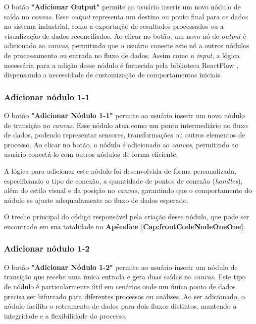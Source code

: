 O botão \textbf{"Adicionar Output"} permite ao usuário inserir um novo nódulo de saída no \textit{canvas}. Esse \textit{output} representa um destino ou ponto final para os dados no sistema industrial, como a exportação de resultados processados ou a visualização de dados reconciliados. Ao clicar no botão, um novo nó de \textit{output} é adicionado ao \textit{canvas}, permitindo que o usuário conecte este nó a outros nódulos de processamento ou entrada no fluxo de dados. Assim como o \textit{input}, a lógica necessária para a adição desse nódulo é fornecida pela biblioteca ReactFlow \cite{reactflow}, dispensando a necessidade de customização de comportamentos iniciais.

\subsubsection{Adicionar nódulo 1-1}

O botão \textbf{"Adicionar Nódulo 1-1"} permite ao usuário inserir um novo nódulo de transição no \textit{canvas}. Esse nódulo atua como um ponto intermediário no fluxo de dados, podendo representar sensores, transformações ou outros elementos de processo. Ao clicar no botão, o nódulo é adicionado ao \textit{canvas}, permitindo ao usuário conectá-lo com outros nódulos de forma eficiente.

A lógica para adicionar este nódulo foi desenvolvida de forma personalizada, especificando o tipo de conexão, a quantidade de pontos de conexão (\textit{handles}), além do estilo visual e da posição no \textit{canvas}, garantindo que o comportamento do nódulo se ajuste adequadamente ao fluxo de dados esperado.

O trecho principal do código responsável pela criação desse nódulo, que pode ser encontrado em sua totalidade no \textbf{Apêndice \ref{Cap:frontCodeNodeOneOne}}.

\subsubsection{Adicionar nódulo 1-2}

O botão \textbf{"Adicionar Nódulo 1-2"} permite ao usuário inserir um nódulo de transição que recebe uma única entrada e gera duas saídas no \textit{canvas}. Este tipo de nódulo é particularmente útil em cenários onde um único ponto de dados precisa ser bifurcado para diferentes processos ou análises. Ao ser adicionado, o nódulo facilita o roteamento de dados para dois fluxos distintos, mantendo a integridade e a flexibilidade do processo.

